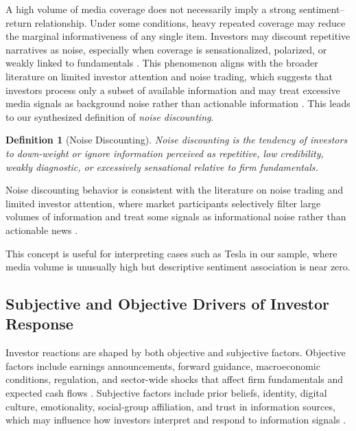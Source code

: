 \documentclass[lettersize,journal]{IEEEtran}
\newtheorem{definition}{Definition}
\begin{document}
A high volume of media coverage does not necessarily imply a strong sentiment--return relationship. Under some conditions, heavy repeated coverage may reduce the marginal informativeness of any single item. Investors may discount repetitive narratives as noise, especially when coverage is sensationalized, polarized, or weakly linked to fundamentals \cite{tetlock2007giving, barber2008all, LI2014826}. This phenomenon aligns with the broader literature on limited investor attention and noise trading, which suggests that investors process only a subset of available information and may treat excessive media signals as background noise rather than actionable information \cite{bollen2011twitter, CHANG2025101045}. This leads to our synthesized definition of \textit{noise discounting}.

\begin{definition}[Noise Discounting]
Noise discounting is the tendency of investors to down-weight or ignore information perceived as repetitive, low credibility, weakly diagnostic, or excessively sensational relative to firm fundamentals.
\end{definition}

Noise discounting behavior is consistent with the literature on noise trading and limited investor attention, where market participants selectively filter large volumes of information and treat some signals as informational noise rather than actionable news \cite{black1986noise, barber2008all, tetlock2007giving}.

This concept is useful for interpreting cases such as Tesla in our sample, where media volume is unusually high but descriptive sentiment association is near zero.

\subsection{Subjective and Objective Drivers of Investor Response}

Investor reactions are shaped by both objective and subjective factors. Objective factors include earnings announcements, forward guidance, macroeconomic conditions, regulation, and sector-wide shocks that affect firm fundamentals and expected cash flows \cite{campbell1997econometrics}. Subjective factors include prior beliefs, identity, digital culture, emotionality, social-group affiliation, and trust in information sources, which may influence how investors interpret and respond to information signals \cite{bollen2011twitter, LI2014826, CHANG2025101045}. 
\end{document}
